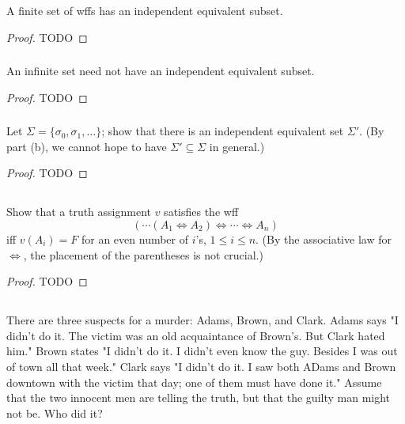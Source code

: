 \documentclass{report}
\begin{document}
  A finite set of wffs has an independent equivalent subset.

  \begin{proof}
    TODO
  \end{proof}

\subsubsection{}%

  An infinite set need not have an independent equivalent subset.

  \begin{proof}
    TODO
  \end{proof}

\subsubsection{}%

  Let $\Sigma = \{\sigma_0, \sigma_1, \ldots\}$; show that there is an
    independent equivalent set $\Sigma'$.
  (By part (b), we cannot hope to have $\Sigma' \subseteq \Sigma$ in general.)

  \begin{proof}
    TODO
  \end{proof}

\subsection{}%

  Show that a truth assignment $v$ satisfies the wff
    $$(\cdots (A_1 \Leftrightarrow A_2)
      \Leftrightarrow \cdots \Leftrightarrow A_n)$$
    iff $v(A_i) = F$ for an even number of $i$'s, $1 \leq i \leq n$.
  (By the associative law for $\Leftrightarrow$, the placement of the
    parentheses is not crucial.)

  \begin{proof}
    TODO
  \end{proof}

\subsection{}%

  There are three suspects for a murder: Adams, Brown, and Clark.
  Adams says "I didn't do it. The victim was an old acquaintance of Brown's.
    But Clark hated him."
  Brown states "I didn't do it. I didn't even know the guy. Besides I was out of
    town all that week."
  Clark says "I didn't do it. I saw both ADams and Brown downtown with the
    victim that day; one of them must have done it."
  Assume that the two innocent men are telling the truth, but that the guilty
    man might not be.
  Who did it?
\end{document}
